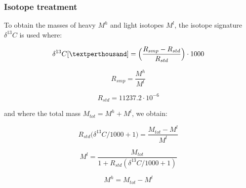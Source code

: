 \documentclass[]{article}
\begin{document}
\subsubsection{Isotope treatment}\label{isotope-treatment}

To obtain the masses of heavy \(M^h\) and light isotopes \(M^l\), the
isotope signature \(\delta ^{13}C\) is used where:

\begin{equation} 
\delta ^{13}C [\textperthousand] = \Big(\frac{R_{smp} - R_{std}}{R_{std}}\Big)\cdot 1000
\end{equation}

\begin{equation} 
R_{smp} = \frac{M^h}{M^l} 
\end{equation}

\begin{equation} 
R_{std} = 11237.2 \cdot 10^{-6}
\end{equation}

and where the total mass \(M_{tot} = M^h + M^l\), we obtain:

\begin{equation} 
R_{std}\Big(\delta ^{13}C/1000+1 \Big)= \frac{M_{tot}-M^l}{M^l}
\end{equation}

\begin{equation} 
M^l = \frac{M_{tot}}{1+R_{std}(\delta ^{13}C/1000+1)}
\end{equation}

\begin{equation} 
M^h = M_{tot} - M^l 
\end{equation}

\renewcommand\refname{References}

\end{document}
